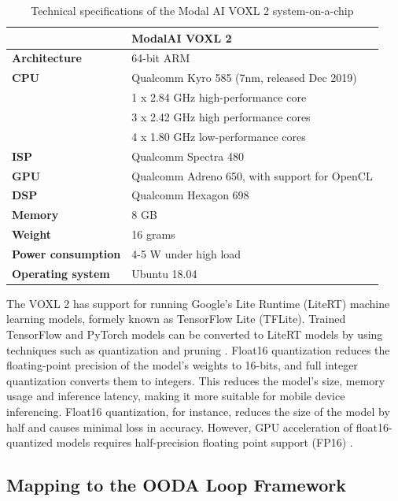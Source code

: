 \begin{table}[htbp]
    \centering
    \begin{tabular}{@{}ll@{}}
        \toprule
        \textbf{} & \textbf{ModalAI VOXL 2}\\
        \midrule
        \textbf{Architecture} & 64-bit ARM\\
        \textbf{CPU} & Qualcomm Kyro 585 (7nm, released Dec 2019)\\
                     & 1 x 2.84 GHz high-performance core\\
                     & 3 x 2.42 GHz high performance cores\\
                     & 4 x 1.80 GHz low-performance cores\\
        \textbf{ISP} & Qualcomm Spectra 480\\
        \textbf{GPU} & Qualcomm Adreno 650, with support for OpenCL\\
        \textbf{DSP} & Qualcomm Hexagon 698\\
        \textbf{Memory} & 8 GB\\
        \textbf{Weight} & 16 grams\\
        \textbf{Power consumption} & 4-5 W under high load\\
        \textbf{Operating system} & Ubuntu 18.04\\
        \bottomrule
    \end{tabular}
    \caption{Technical specifications of the Modal AI VOXL 2 system-on-a-chip}
    \label{tab:voxl2-specs}
\end{table}

The VOXL 2 has support for running Google's Lite Runtime (LiteRT) machine
learning models, formely known as TensorFlow Lite (TFLite). Trained TensorFlow
and PyTorch models can be converted to LiteRT models by using techniques such
as quantization and pruning \cite{jacob2017}. Float16 quantization reduces the
floating-point precision of the model's weights to 16-bits, and full integer
quantization converts them to integers. This reduces the model's size, memory
usage and inference latency, making it more suitable for mobile device
inferencing. Float16 quantization, for instance, reduces the size of the model
by half and causes minimal loss in accuracy. However, GPU acceleration of
float16-quantized models requires half-precision floating point support (FP16)
\cite{ho2017}.

\subsection{Mapping to the OODA Loop Framework}

